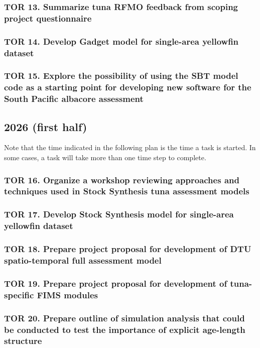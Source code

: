 \documentclass{SCreport}
\begin{document}
\subsubsection{TOR 13. Summarize tuna RFMO feedback from scoping project
  questionnaire}

\subsubsection{TOR 14. Develop Gadget model for single-area yellowfin dataset}

\subsubsection{TOR 15. Explore the possibility of using the SBT model code as a
  starting point for developing new software for the South Pacific albacore
  assessment}

\subsection{2026 (first half)}

Note that the time indicated in the following plan is the time a task is
started. In some cases, a task will take more than one time step to complete.

\subsubsection{TOR 16. Organize a workshop reviewing approaches and techniques
  used in Stock Synthesis tuna assessment models}

\subsubsection{TOR 17. Develop Stock Synthesis model for single-area yellowfin
  dataset}

\subsubsection{TOR 18. Prepare project proposal for development of DTU
  spatio-temporal full assessment model}

\subsubsection{TOR 19. Prepare project proposal for development of tuna-specific
  FIMS modules}

\subsubsection{TOR 20. Prepare outline of simulation analysis that could be
  conducted to test the importance of explicit age-length structure}
\end{document}
